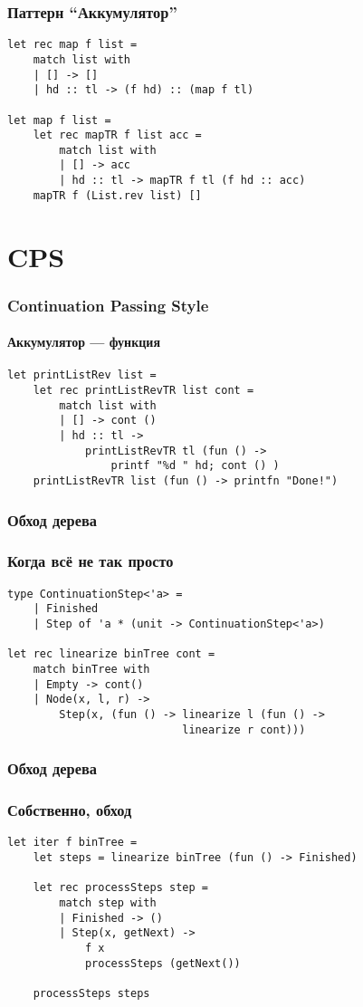 \documentclass[xetex,mathserif,serif]{beamer}
\begin{document}
    \begin{frame}[fragile]
        \frametitle{Паттерн ``Аккумулятор''}
        \begin{verbatim}
let rec map f list =
    match list with
    | [] -> []
    | hd :: tl -> (f hd) :: (map f tl)

let map f list =
    let rec mapTR f list acc =
        match list with
        | [] -> acc
        | hd :: tl -> mapTR f tl (f hd :: acc)
    mapTR f (List.rev list) []
        \end{verbatim}
    \end{frame}

    \section{CPS}

    \begin{frame}[fragile]
        \frametitle{Continuation Passing Style}
        \framesubtitle{Аккумулятор --- функция}
        \begin{verbatim}
let printListRev list =
    let rec printListRevTR list cont =
        match list with
        | [] -> cont ()
        | hd :: tl ->
            printListRevTR tl (fun () -> 
                printf "%d " hd; cont () )
    printListRevTR list (fun () -> printfn "Done!")
        \end{verbatim}
    \end{frame}

    \begin{frame}[fragile]
        \frametitle{Обход дерева}
        \frametitle{Когда всё не так просто}
        \begin{verbatim}
type ContinuationStep<'a> =
    | Finished
    | Step of 'a * (unit -> ContinuationStep<'a>)

let rec linearize binTree cont =
    match binTree with
    | Empty -> cont()
    | Node(x, l, r) ->
        Step(x, (fun () -> linearize l (fun () -> 
                           linearize r cont)))
        \end{verbatim}
    \end{frame}

    \begin{frame}[fragile]
        \frametitle{Обход дерева}
        \frametitle{Собственно, обход}
        \begin{verbatim}
let iter f binTree =
    let steps = linearize binTree (fun () -> Finished)

    let rec processSteps step =
        match step with
        | Finished -> ()
        | Step(x, getNext) -> 
            f x
            processSteps (getNext())
    
    processSteps steps
        \end{verbatim}
    \end{frame}
\end{document}
